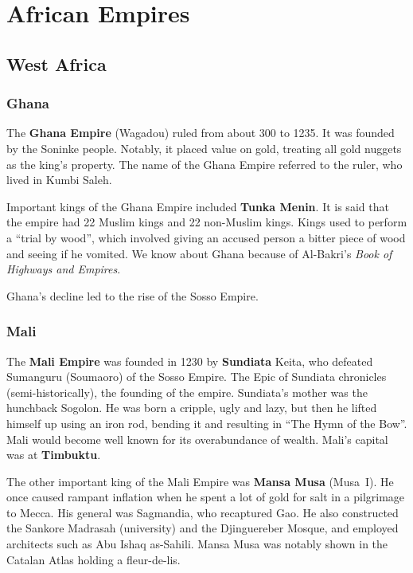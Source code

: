 \chapter{African Empires}

\section{West Africa}

\subsection*{Ghana}

The \textbf{Ghana Empire} (Wagadou) ruled from about 300 to 1235.
It was founded by the Soninke people.
Notably, it placed value on gold, treating all gold nuggets as the king's property.
The name of the Ghana Empire referred to the ruler, who lived in Kumbi Saleh.

Important kings of the Ghana Empire included \textbf{Tunka Menin}.
It is said that the empire had 22 Muslim kings and 22 non-Muslim kings.
Kings used to perform a ``trial by wood'',
which involved giving an accused person a bitter piece of wood and seeing if he vomited.
We know about Ghana because of Al-Bakri's \textit{Book of Highways and Empires}.

Ghana's decline led to the rise of the Sosso Empire.

\subsection*{Mali}

The \textbf{Mali Empire} was founded in 1230 by \textbf{Sundiata} Keita,
who defeated Sumanguru (Soumaoro) of the Sosso Empire.
The Epic of Sundiata chronicles (semi-historically), the founding of the empire.
Sundiata's mother was the hunchback Sogolon.
He was born a cripple, ugly and lazy,
but then he lifted himself up using an iron rod, bending it and resulting in ``The Hymn of the Bow''.
Mali would become well known for its overabundance of wealth.
Mali's capital was at \textbf{Timbuktu}.

The other important king of the Mali Empire was \textbf{Mansa Musa} (Musa~I).
He once caused rampant inflation when he spent a lot of gold for salt in a pilgrimage to Mecca.
His general was Sagmandia, who recaptured Gao.
He also constructed the Sankore Madrasah (university) and the Djinguereber Mosque,
and employed architects such as Abu Ishaq as-Sahili.
Mansa Musa was notably shown in the Catalan Atlas holding a fleur-de-lis.

